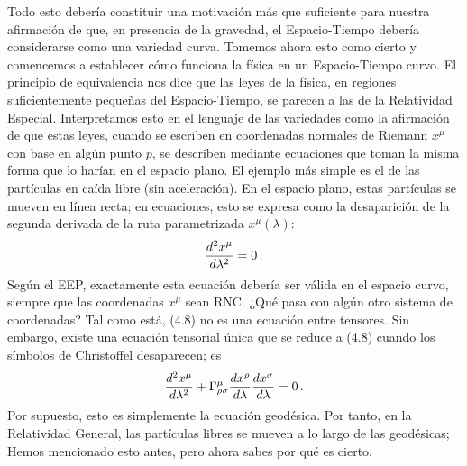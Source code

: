 \documentclass[11pt,b5paper,openany,twoside]{book}
\begin{document}
Todo esto debería constituir una motivación más que suficiente para nuestra afirmación de que, en presencia de la gravedad, el Espacio-Tiempo debería considerarse como una variedad curva.
Tomemos ahora esto como cierto y comencemos a establecer cómo funciona la física en un Espacio-Tiempo curvo.
El principio de equivalencia nos dice que las leyes de la física, en regiones suficientemente pequeñas del Espacio-Tiempo, se parecen a las de la Relatividad Especial.
Interpretamos esto en el lenguaje de las variedades como la afirmación de que estas leyes, cuando se escriben en coordenadas normales de Riemann $x^\mu$ con base en algún punto $p$, se describen mediante ecuaciones que toman la misma forma que lo harían en el espacio plano.
El ejemplo más simple es el de las partículas en caída libre (sin aceleración).
En el espacio plano, estas partículas se mueven en línea recta; en ecuaciones, esto se expresa como la desaparición de la segunda derivada de la ruta parametrizada $x^\mu(\lambda)$:
\begin{equation}
{{d^2 x^\mu}\over{d\lambda^2}} = 0\,.\label{4.8}
\end{equation}
Según el EEP, exactamente esta ecuación debería ser válida en el espacio curvo, siempre que las coordenadas $x^\mu$ sean RNC.
¿Qué pasa con algún otro sistema de coordenadas? Tal como está, (4.8) no es una ecuación entre tensores.
Sin embargo, existe una ecuación tensorial única que se reduce a (4.8) cuando los símbolos de Christoffel desaparecen; es
\begin{equation}
{{d^2 x^\mu}\over{d\lambda^2}}+\Gamma^\mu_{\rho\sigma}
{{d x^\rho}\over{d\lambda}}{{d x^\sigma}\over{d\lambda}} = 0\,.
\label{4.9}
\end{equation}
Por supuesto, esto es simplemente la ecuación geodésica.
Por tanto, en la Relatividad General, las partículas libres se mueven a lo largo de las geodésicas; Hemos mencionado esto antes, pero ahora sabes por qué es cierto.
\end{document}
